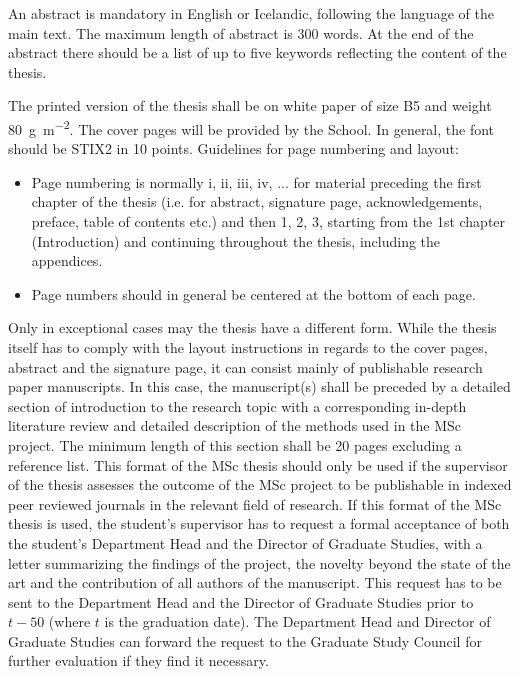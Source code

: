 An abstract is mandatory in English or Icelandic, following the language of the main text.
The maximum length of abstract is 300 words.
At the end of the abstract there should be a list of up to five keywords reflecting the content of the thesis.

The printed version of the thesis shall be on white paper of size B5 and weight \SI{80}{\gram\per\square\meter}.
The cover pages will be provided by the School. In general, the font should be STIX2 in 10 points.
Guidelines for page numbering and layout:

\begin{itemize}
\item Page numbering is normally i, ii, iii, iv, ... for material preceding the first chapter of the thesis (i.e. for abstract, signature page, acknowledgements, preface, table of contents etc.) and then
1, 2, 3, starting from the 1st chapter (Introduction) and continuing throughout the thesis, including the appendices.
\item Page numbers should in general be centered at the bottom of each page.
\end{itemize}
Only in exceptional cases may the thesis have a different form.
While the thesis itself has to comply with the layout instructions in regards to the cover pages, abstract and the signature page, it can consist mainly of publishable research paper manuscripts.
In this case, the manuscript(s) shall be preceded by a detailed section of introduction to the research topic with a corresponding in-depth literature review and detailed description of the methods used in the MSc project.
The minimum length of this section shall be 20 pages excluding a reference list.
This format of the MSc thesis should only be used if the supervisor of the thesis assesses the outcome of the MSc project to be publishable in indexed peer reviewed journals in the relevant field of research.
If this format of the MSc thesis is used, the student's supervisor has to request a formal acceptance of both the student's Department Head and the Director of Graduate Studies, with a letter summarizing the findings of the project, the novelty beyond the state of the art and the contribution of all authors of the manuscript.
This request has to be sent to the Department Head and the Director of Graduate Studies prior to $t-50$ (where $t$ is the graduation date).
The Department Head and Director of Graduate Studies can forward the request to the Graduate Study Council for further evaluation if they find it necessary.

